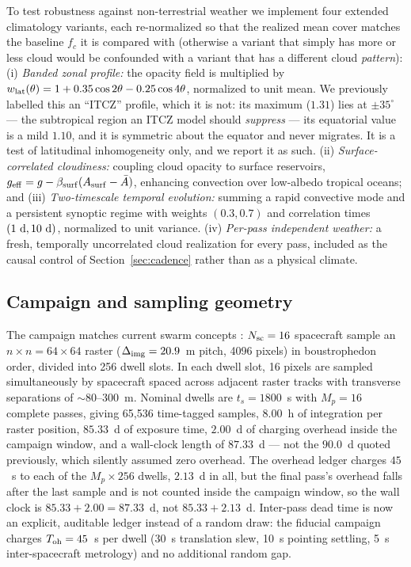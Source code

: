 \documentclass[twocolumn,10pt]{article}
\begin{document}
To test robustness against non-terrestrial weather we implement four
extended climatology variants, each re-normalized so that the realized mean
cover matches the baseline $f_c$ it is compared with (otherwise a variant that
simply has more or less cloud would be confounded with a variant that has a
different cloud \emph{pattern}):
(i) {\it Banded zonal profile:} the opacity field is multiplied by
$w_{\rm lat}(\theta)=1+0.35\cos2\theta-0.25\cos4\theta$, normalized to unit
mean. We previously labelled this an ``ITCZ'' profile, which it is not: its
maximum ($1.31$) lies at $\pm35^\circ$ --- the subtropical region an ITCZ model
should \emph{suppress} --- its equatorial value is a mild $1.10$, and it is
symmetric about the equator and never migrates. It is a test of latitudinal
inhomogeneity only, and we report it as such.
(ii) {\it Surface-correlated cloudiness:} coupling cloud opacity to surface
reservoirs, $g_{\rm eff}=g-\beta_{\rm surf}(A_{\rm surf}-\bar{A})$, enhancing
convection over low-albedo tropical oceans; and
(iii) {\it Two-timescale temporal evolution:} summing a rapid convective
mode and a persistent synoptic regime with weights $(0.3,0.7)$ and correlation
times $(1~{\rm d},10~{\rm d})$, normalized to unit variance.
(iv) {\it Per-pass independent weather:} a fresh, temporally uncorrelated
cloud realization for every pass, included as the causal control of
Section~\ref{sec:cadence} rather than as a physical climate.

\subsection{Campaign and sampling geometry}
The campaign matches current swarm concepts \citep{tt22mnras,helvajian23}:
$N_{\rm sc}=16$ spacecraft sample an $n\times n=64\times64$ raster
($\Delta_{\rm img}=20.9$~m pitch, 4096 pixels) in boustrophedon order,
divided into 256 dwell slots. In each dwell slot, 16 pixels are sampled
simultaneously by spacecraft spaced across adjacent raster tracks with
transverse separations of $\sim$80--300~m. Nominal dwells are
$t_s=1800$~s with $M_p=16$ complete passes, giving 65{,}536 time-tagged
samples, $8.00$~h of integration per raster position, $85.33$~d of exposure
time, $2.00$~d of charging overhead inside the campaign window, and a
wall-clock length of $\mathbf{87.33}$~d --- not the $90.0$~d quoted previously,
which silently assumed zero overhead. The overhead ledger charges $45$~s to
each of the $M_p\times256$ dwells, $2.13$~d in all, but the final pass's
overhead falls after the last sample and is not counted inside the campaign
window, so the wall clock is $85.33+2.00=87.33$~d, not $85.33+2.13$~d.
Inter-pass dead time is now an explicit,
auditable ledger instead of a random draw: the fiducial campaign charges
$T_{\rm oh}=45$~s per dwell (30~s translation slew, 10~s pointing settling,
5~s inter-spacecraft metrology) and no additional random gap.
\end{document}
